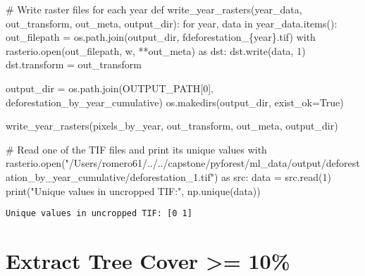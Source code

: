 \documentclass[
  letterpaper,
  DIV=11,
  numbers=noendperiod]{scrartcl}
\newenvironment{Shaded}{\begin{snugshade}}{\end{snugshade}}
\newcommand{\BuiltInTok}[1]{\textcolor[rgb]{0.00,0.23,0.31}{#1}}
\newcommand{\CommentTok}[1]{\textcolor[rgb]{0.37,0.37,0.37}{#1}}
\newcommand{\ControlFlowTok}[1]{\textcolor[rgb]{0.00,0.23,0.31}{#1}}
\newcommand{\DecValTok}[1]{\textcolor[rgb]{0.68,0.00,0.00}{#1}}
\newcommand{\ImportTok}[1]{\textcolor[rgb]{0.00,0.46,0.62}{#1}}
\newcommand{\KeywordTok}[1]{\textcolor[rgb]{0.00,0.23,0.31}{#1}}
\newcommand{\NormalTok}[1]{\textcolor[rgb]{0.00,0.23,0.31}{#1}}
\newcommand{\OperatorTok}[1]{\textcolor[rgb]{0.37,0.37,0.37}{#1}}
\newcommand{\SpecialCharTok}[1]{\textcolor[rgb]{0.37,0.37,0.37}{#1}}
\newcommand{\SpecialStringTok}[1]{\textcolor[rgb]{0.13,0.47,0.30}{#1}}
\newcommand{\StringTok}[1]{\textcolor[rgb]{0.13,0.47,0.30}{#1}}
\newcommand{\VariableTok}[1]{\textcolor[rgb]{0.07,0.07,0.07}{#1}}
\begin{document}
\begin{Shaded}
\begin{Highlighting}[]
\CommentTok{\# Write raster files for each year}
\KeywordTok{def}\NormalTok{ write\_year\_rasters(year\_data, out\_transform, out\_meta, output\_dir):}
    \ControlFlowTok{for}\NormalTok{ year, data }\KeywordTok{in}\NormalTok{ year\_data.items():}
\NormalTok{        out\_filepath }\OperatorTok{=}\NormalTok{ os.path.join(output\_dir, }\SpecialStringTok{f\textquotesingle{}deforestation\_}\SpecialCharTok{\{}\NormalTok{year}\SpecialCharTok{\}}\SpecialStringTok{.tif\textquotesingle{}}\NormalTok{)}
        \ControlFlowTok{with}\NormalTok{ rasterio.}\BuiltInTok{open}\NormalTok{(out\_filepath, }\StringTok{\textquotesingle{}w\textquotesingle{}}\NormalTok{, }\OperatorTok{**}\NormalTok{out\_meta) }\ImportTok{as}\NormalTok{ dst:}
\NormalTok{            dst.write(data, }\DecValTok{1}\NormalTok{)}
\NormalTok{            dst.transform }\OperatorTok{=}\NormalTok{ out\_transform}

\NormalTok{output\_dir }\OperatorTok{=}\NormalTok{ os.path.join(OUTPUT\_PATH[}\DecValTok{0}\NormalTok{], }\StringTok{\textquotesingle{}deforestation\_by\_year\_cumulative\textquotesingle{}}\NormalTok{)}
\NormalTok{os.makedirs(output\_dir, exist\_ok}\OperatorTok{=}\VariableTok{True}\NormalTok{)}

\NormalTok{write\_year\_rasters(pixels\_by\_year, out\_transform, out\_meta, output\_dir)}
\end{Highlighting}
\end{Shaded}

\begin{Shaded}
\begin{Highlighting}[]
\CommentTok{\# Read one of the TIF files and print its unique values}
\ControlFlowTok{with}\NormalTok{ rasterio.}\BuiltInTok{open}\NormalTok{(}\StringTok{"/Users/romero61/../../capstone/pyforest/ml\_data/output/deforestation\_by\_year\_cumulative/deforestation\_1.tif"}\NormalTok{) }\ImportTok{as}\NormalTok{ src:}
\NormalTok{    data }\OperatorTok{=}\NormalTok{ src.read(}\DecValTok{1}\NormalTok{)}
\BuiltInTok{print}\NormalTok{(}\StringTok{"Unique values in uncropped TIF:"}\NormalTok{, np.unique(data))}
\end{Highlighting}
\end{Shaded}

\begin{verbatim}
Unique values in uncropped TIF: [0 1]
\end{verbatim}

\hypertarget{extract-tree-cover-10}{%
\section{Extract Tree Cover \textgreater=
10\%}\label{extract-tree-cover-10}}
\end{document}
